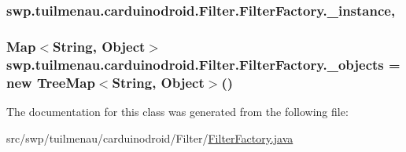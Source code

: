 \subsubsection[{\+\_\+instance}]{ swp.\+tuilmenau.\+carduinodroid.\+Filter.\+Filter\+Factory.\+\_\+instance\hspace{0.3cm}{\ttfamily [static]}, {\ttfamily [protected]}}\label{classswp_1_1tuilmenau_1_1carduinodroid_1_1_filter_1_1_filter_factory_ace6d6288eefdca08fc97e0aeab5409a0}
\hypertarget{classswp_1_1tuilmenau_1_1carduinodroid_1_1_filter_1_1_filter_factory_a8015fffcdd394fc33a983953771bb875}{}
\subsubsection[{\+\_\+objects}]{\setlength{\rightskip}{0pt plus 5cm}Map$<$String, Object$>$ swp.\+tuilmenau.\+carduinodroid.\+Filter.\+Filter\+Factory.\+\_\+objects = new Tree\+Map$<$String, Object$>$()\hspace{0.3cm}{\ttfamily [protected]}}\label{classswp_1_1tuilmenau_1_1carduinodroid_1_1_filter_1_1_filter_factory_a8015fffcdd394fc33a983953771bb875}


The documentation for this class was generated from the following file\+:\begin{DoxyCompactItemize}
\item 
src/swp/tuilmenau/carduinodroid/\+Filter/\hyperlink{_filter_factory_8java}{Filter\+Factory.\+java}\end{DoxyCompactItemize}
